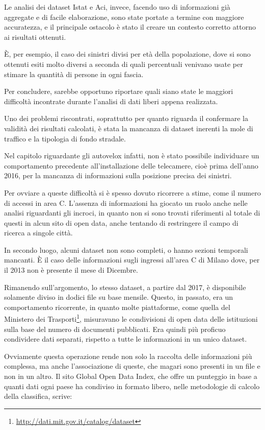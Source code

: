 \documentclass[a4paper,12pt]{report}
\newcommand{\skipline}{\vspace{0.2in}}
\begin{document}
Le analisi dei dataset Istat e Aci, invece, facendo uso di informazioni già aggregate 
e di facile elaborazione, sono state portate a termine con maggiore 
accuratezza, e il principale ostacolo è stato il creare un contesto 
corretto attorno ai risultati ottenuti. 

\`E, per esempio, il caso dei sinistri divisi per età della popolazione, 
dove si sono ottenuti esiti 
molto diversi a seconda di quali percentuali venivano usate per stimare la quantità di 
persone in ogni fascia. 

\skipline
Per concludere, sarebbe opportuno riportare quali siano state le maggiori difficoltà 
incontrate durante l'analisi di dati liberi appena realizzata. 

Uno dei problemi riscontrati, soprattutto per quanto riguarda il confermare la 
validità dei risultati calcolati, è stata la mancanza di dataset 
inerenti la mole di traffico e la tipologia di fondo stradale.

Nel capitolo riguardante gli autovelox infatti, non è stato possibile individuare 
un comportamento precedente all'installazione delle telecamere, cioè prima dell'anno 2016, 
per la mancanza di informazioni sulla posizione precisa dei sinistri. 

Per ovviare a queste difficoltà si è spesso dovuto ricorrere a stime, 
come il numero di accessi in area C. 
L'assenza di informazioni ha giocato un ruolo anche nelle analisi riguardanti gli incroci, 
in quanto non si sono trovati riferimenti al totale di questi in alcun sito di open data, 
anche tentando di restringere il campo di ricerca a singole città. 


In secondo luogo, alcuni dataset non sono completi, o hanno sezioni temporali mancanti. 
\`E il caso delle informazioni sugli ingressi all'area C di Milano dove, 
per il 2013 non è presente il mese di Dicembre. 

Rimanendo sull'argomento, lo stesso dataset, a partire dal 2017, è disponibile 
solamente diviso in dodici file su base mensile. 
Questo, in passato, era un comportamento ricorrente, in 
quanto molte piattaforme, come quella del Ministero dei 
Trasporti\footnote{\url{http://dati.mit.gov.it/catalog/dataset}}, 
misuravano le condivisioni di open data delle istituzioni 
sulla base del numero di documenti pubblicati. 
Era quindi più proficuo condividere dati separati, rispetto a tutte le informazioni in 
un unico dataset. 

Ovviamente questa operazione rende non solo la raccolta delle informazioni più complessa, 
ma anche l'associazione di queste, che magari sono presenti in un file e non in un altro. 
Il sito Global Open Data Index, che offre un punteggio in base a quanti dati ogni paese 
ha condiviso in formato libero, nelle metodologie di calcolo della classifica, scrive: 
\end{document}
